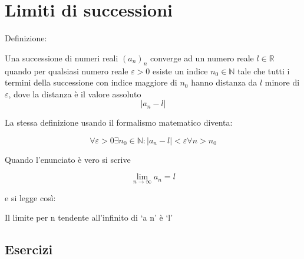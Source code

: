 \section{Limiti di successioni}\label{subsec:limiti:successioni}

Definizione:

Una successione di numeri reali $(a_n)_n$ converge ad un numero reale 
$l\in \mathbb{R}$ quando per qualsiasi numero reale
$\varepsilon > 0$ esiste un indice 
$n_0\in \mathbb{N}$ tale che tutti i termini della successione con indice maggiore di 
$n_0$ hanno distanza da $l$ minore di $\varepsilon$, dove la distanza è il valore assoluto
\begin{equation*}
\left| a_n-l \right|
\end{equation*}


La stessa definizione usando il formalismo matematico diventa:

\begin{equation*}
\forall \varepsilon > 0  \exists n_0\in \mathbb{N} : \left|a_n-l\right| < \varepsilon
\forall n>n_0
\end{equation*}

Quando l'enunciato è vero si scrive

\begin{equation*}
\lim_{n\to\infty}a_n = l
\end{equation*}

e si legge così: 


Il limite per n tendente all'infinito di `a n' è `l'

\subsection{Esercizi}

